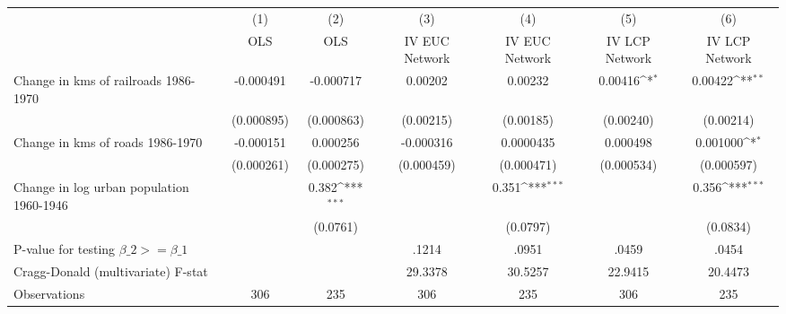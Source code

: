 {
\def\sym#1{\ifmmode^{#1}\else\(^{#1}\)\fi}
\begin{tabular}{l*{6}{c}}
\hline\hline
                &\multicolumn{1}{c}{(1)}&\multicolumn{1}{c}{(2)}&\multicolumn{1}{c}{(3)}&\multicolumn{1}{c}{(4)}&\multicolumn{1}{c}{(5)}&\multicolumn{1}{c}{(6)}\\
                &\multicolumn{1}{c}{OLS}&\multicolumn{1}{c}{OLS}&\multicolumn{1}{c}{IV EUC Network}&\multicolumn{1}{c}{IV EUC Network}&\multicolumn{1}{c}{IV LCP Network}&\multicolumn{1}{c}{IV LCP Network}\\
\hline
Change in kms of railroads 1986-1970&-0.000491         &-0.000717         &  0.00202         &  0.00232         &  0.00416\sym{*}  &  0.00422\sym{**} \\
                &(0.000895)         &(0.000863)         &(0.00215)         &(0.00185)         &(0.00240)         &(0.00214)         \\
[1em]
Change in kms of roads 1986-1970&-0.000151         & 0.000256         &-0.000316         &0.0000435         & 0.000498         & 0.001000\sym{*}  \\
                &(0.000261)         &(0.000275)         &(0.000459)         &(0.000471)         &(0.000534)         &(0.000597)         \\
[1em]
Change in log urban population 1960-1946&                  &    0.382\sym{***}&                  &    0.351\sym{***}&                  &    0.356\sym{***}\\
                &                  & (0.0761)         &                  & (0.0797)         &                  & (0.0834)         \\
\hline
P-value for testing $\beta\_{2} >= \beta\_{1}$&                  &                  &    .1214         &    .0951         &    .0459         &    .0454         \\
Cragg-Donald (multivariate) F-stat&                  &                  &  29.3378         &  30.5257         &  22.9415         &  20.4473         \\
Observations    &      306         &      235         &      306         &      235         &      306         &      235         \\
\hline\hline
\end{tabular}
}
